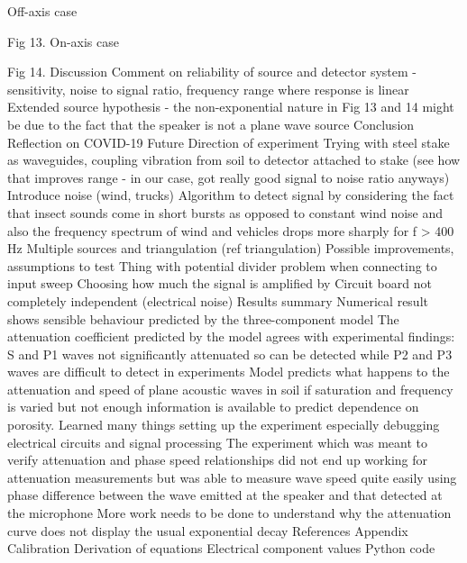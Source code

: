 \documentclass[twocolumn]{article}
\begin{document}
Off-axis case

Fig 13.
On-axis case

Fig 14.
Discussion
Comment on reliability of source and detector system - sensitivity, noise to signal ratio, frequency range where response is linear
Extended source hypothesis - the non-exponential nature in Fig 13 and 14 might be due to the fact that the speaker is not a plane wave source
Conclusion
Reflection on COVID-19
Future Direction of experiment
Trying with steel stake as waveguides, coupling vibration from soil to detector attached to stake (see how that improves range - in our case, got really good signal to noise ratio anyways)
Introduce noise (wind, trucks)
Algorithm to detect signal by considering the fact that insect sounds come in short bursts as opposed to constant wind noise and also the frequency spectrum of wind and vehicles drops more sharply for f > 400 Hz
Multiple sources and triangulation (ref triangulation)
Possible improvements, assumptions to test
Thing with potential divider problem when connecting to input sweep
Choosing how much the signal is amplified by
Circuit board not completely independent (electrical noise)
Results summary
Numerical result shows sensible behaviour predicted by the three-component model
The attenuation coefficient predicted by the model agrees with experimental findings: S and P1 waves not significantly attenuated so can be detected while P2 and P3 waves are difficult to detect in experiments
Model predicts what happens to the attenuation and speed of plane acoustic waves in soil if saturation and frequency is varied but not enough information is available to predict dependence on porosity.
Learned many things setting up the experiment especially debugging electrical circuits and signal processing
The experiment which was meant to verify attenuation and phase speed relationships did not end up working for attenuation measurements but was able to measure wave speed quite easily using phase difference between the wave emitted at the speaker and that detected at the microphone
More work needs to be done to understand why the attenuation curve does not display the usual exponential decay
References
Appendix
Calibration
Derivation of equations
Electrical component values
Python code

\printbibliography
\end{document}
